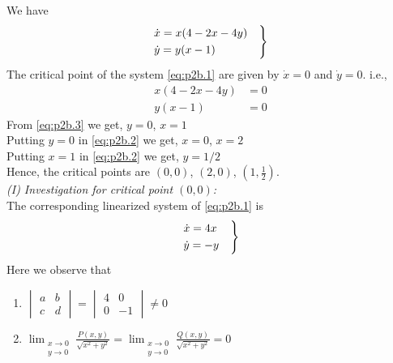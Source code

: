 \documentclass[../main-sheet.tex]{subfiles}
\begin{document}
\begin{soln}[b]
    We have
    \begin{equation}
        \begin{rcases}
            \displaystyle\dot{x}=x(4-2x-4y)\quad\\
            \displaystyle\dot{y}=y(x-1)
        \end{rcases}
        \label{eq:p2b.1}
    \end{equation}
    The critical point of the system \eqref{eq:p2b.1} are given by \(\dot{x}=0\) and \(\dot{y}=0\). i.e.,
    \begin{align}
        x(4-2x-4y)&=0\label{eq:p2b.2}\\
        y(x-1)&=0\label{eq:p2b.3}
    \end{align}
    From \eqref{eq:p2b.3} we get, \(y=0\), \(x=1\)\\
    Putting \(y=0\) in \eqref{eq:p2b.2} we get, \(x=0\), \(x=2\)\\
    Putting \(x=1\) in \eqref{eq:p2b.2} we get, \(y=1/2\)\\


    Hence, the critical points are \((0,0)\), \((2,0)\), \((1,\frac{1}{2})\).\\
    
    
    \emph{(I) Investigation for critical point \((0,0)\):}\\
    The corresponding linearized system of \eqref{eq:p2b.1} is 
    \begin{equation}
        \begin{rcases}
            \dot{x}=4x\\
            \dot{y}=-y\quad
        \end{rcases}
        \label{eq:p2b.4}
    \end{equation}
    Here we observe that
    \begin{enumerate}[label=(\roman*)]
        \item \(\begin{vmatrix}
            a&b\\
            c&d
        \end{vmatrix}=\begin{vmatrix}
            4&0\\
            0&-1
        \end{vmatrix}\neq 0\)
        \item \(\displaystyle\lim_{\substack{x\to 0 \\ y\to 0}} \frac{P(x,y)}{\sqrt{x^2+y^2}}=\lim_{\substack{x\to 0 \\ y\to 0}} \frac{Q(x,y)}{\sqrt{x^2+y^2}}=0\)\\ 
        

\end{enumerate}
\end{soln}
\end{document}
